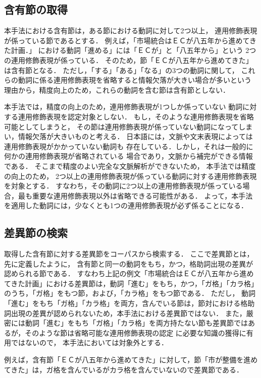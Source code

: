 \subsection{含有節の取得}
本手法における含有節は，ある節における動詞に対して2つ以上，
連用修飾表現が係っている節であるとする．
例えば，「市場統合はＥＣが八五年から進めてきた計画．」
における動詞「進める」には「ＥＣが」と「八五年から」という
2つの連用修飾表現が係っている．
そのため，節「ＥＣが八五年から進めてきた」は含有節となる．
ただし，「する」「ある」「なる」の3つの動詞に関して，
これらの動詞に係る連用修飾表現を省略すると情報欠落が大きい場合が多いという
理由から，精度向上のため，これらの動詞を含む節は含有節としない．

本手法では，精度の向上のため，連用修飾表現が1つしか係っていない
動詞に対する連用修飾表現を認定対象としない．
もし，そのような連用修飾表現を省略可能としてしまうと，
その節は連用修飾表現が係っていない動詞になってしまい，情報欠落が大きいものと考える．
日本語には，文脈や文末表現によっては連用修飾表現がかかっていない動詞も
存在している．しかし，それは一般的に何かの連用修飾表現が省略されている
場合であり，文脈から補完ができる情報である．
そこまで精度のよい完全な文脈解析ができないため，
本手法では精度の向上のため，
2つ以上の連用修飾表現が係っている動詞に対する連用修飾表現を対象とする．
すなわち，その動詞に2つ以上の連用修飾表現が係っている場合，最も重要な連用修飾表現以外は省略できる可能性がある．
よって，本手法を適用した動詞には，少なくとも1つの連用修飾表現が必ず係ることになる．
\subsection{差異節の検索}
取得した含有節に対する差異節をコーパスから検索する．
ここで差異節とは，先に定義したように，
含有節と同一の動詞をもち，かつ，格助詞出現の差異が認められる節である．
すなわち上記の例文「市場統合はＥＣが八五年から進めてきた計画」における差異節は，動詞「進む」をもち，かつ，「ガ格」「カラ格」のうち，「ガ格」をもつ節，および，「カラ格」をもつ節である．
ただし，
動詞「進む」をもち「ガ格」「カラ格」を両方，含んでいる節は，節対における格助詞出現の差異が認められないため，本手法における差異節ではない．
また，厳密には動詞「進む」をもち「ガ格」「カラ格」を両方持たない節も差異節ではあるが，そのような節は省略可能な連用修飾表現の認定
に必要な知識の獲得に有用ではないので，
本手法においては対象外とする．

例えば，含有節「ＥＣが八五年から進めてきた」に対して，節「市が整備を進めてきた」は，ガ格を含んでいるがカラ格を含んでいないので差異節である．
